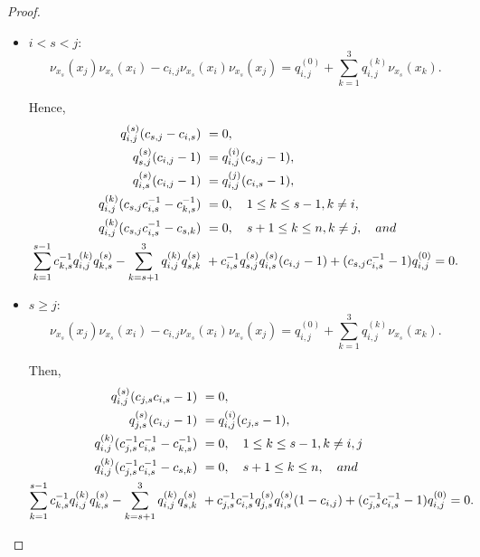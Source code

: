 \documentclass{amsart}
\theoremstyle{definition}
\theoremstyle{remark}
\numberwithin{equation}{section}
\begin{document}
\begin{proof}
\begin{itemize}
     \item $i < s < j$: 
    \begin{equation*}
        \nu_{x_s}(x_j)\nu_{x_s}(x_i)-c_{i,j}\nu_{x_s}(x_i)\nu_{x_s}(x_j) = q_{i,j}^{(0)}+\sum_{k=1}^{3}q_{i,j}^{(k)}\nu_{x_s}(x_k).
    \end{equation*}
    
    Hence, 
    \begin{align*}
        q_{i,j}^{(s)}(c_{s,j}-c_{i,s}) &\ =0, \\
        q_{s,j}^{(s)}(c_{i,j}-1) &\ = q_{i,j}^{(i)}(c_{s,j}-1), \\
        q_{i,s}^{(s)}(c_{i,j}-1) &\ = q_{i,j}^{(j)}(c_{i,s}-1), \\
        q_{i,j}^{(k)}(c_{s,j}c_{i,s}^{-1}-c_{k,s}^{-1}) &\ =0, \quad 1\leq k \leq s-1, k \ne i,  \\
        q_{i,j}^{(k)}(c_{s,j}c_{i,s}^{-1}-c_{s,k}) &\ =0, \quad s+1\leq k \leq n, k\ne j, \quad {\rm and} \\
        \sum_{k=1}^{s-1}c_{k,s}^{-1}q_{i,j}^{(k)}q_{k,s}^{(s)} -  \sum_{k=s+1}^{3}q_{i,j}^{(k)}q_{s,k}^{(s)} &\ + c_{i,s}^{-1}q_{s,j}^{(s)}q_{i,s}^{(s)}(c_{i,j}-1)  +(c_{s,j}c_{i,s}^{-1}-1)q_{i,j}^{(0)}  = 0.
    \end{align*}
    
    \item $s\geq j$: 
    \begin{equation*}
        \nu_{x_s}(x_j)\nu_{x_s}(x_i)-c_{i,j}\nu_{x_s}(x_i)\nu_{x_s}(x_j) = q_{i,j}^{(0)}+\sum_{k=1}^{3}q_{i,j}^{(k)}\nu_{x_s}(x_k).
    \end{equation*}

Then, 
    \begin{align*}
        q_{i,j}^{(s)}(c_{j,s}c_{i,s}-1) &\ =0, \\
        q_{j,s}^{(s)}(c_{i,j}-1) &\ = q_{i,j}^{(i)}(c_{j,s}-1), \\
        q_{i,j}^{(k)}(c_{j,s}^{-1}c_{i,s}^{-1}-c_{k,s}^{-1}) &\ =0, \quad 1\leq k \leq s-1, k \ne i, j\\
        q_{i,j}^{(k)}(c_{j,s}^{-1}c_{i,s}^{-1}-c_{s,k}) &\ =0, \quad s+1\leq k \leq n,  \quad {\rm and} \\
        \sum_{k=1}^{s-1}c_{k,s}^{-1}q_{i,j}^{(k)}q_{k,s}^{(s)} - \sum_{k=s+1}^{3}q_{i,j}^{(k)}q_{s,k}^{(s)}  &\ + c_{j,s}^{-1}c_{i,s}^{-1}q_{j,s}^{(s)}q_{i,s}^{(s)}(1-c_{i,j})  +(c_{j,s}^{-1}c_{i,s}^{-1}-1)q_{i,j}^{(0)}  = 0.
    \end{align*}
\end{itemize}


\end{proof}
\end{document}
